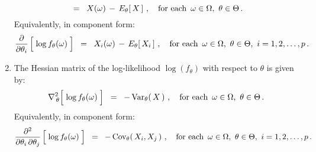 \begin{theorem}
\begin{enumerate}
\begin{equation*}
	\;\; = \;\;
		X(\omega) \, - \, E_{\theta}\!\left[\,X\,\right]\,,
	\quad
	\textnormal{for each \,$\omega\in\Omega$, \,$\theta\in\Theta$}\,.
	\end{equation*}	
	Equivalently, in component form:
	\begin{equation*}
	\dfrac{\partial}{\partial \theta_{i}}\left[\;\overset{{\color{white}.}}{\log}\,f_{\theta}(\omega)\;\right]
	\;\; = \;\;
		X_{i}(\omega) \, - \, E_{\theta}\!\left[\,X_{i}\,\right]\,,
	\quad
	\textnormal{for each \,$\omega\in\Omega$, \,$\theta\in\Theta$, \,$i = 1,2,\ldots,p$}\,.
	\end{equation*}	
\item
	The Hessian matrix of the log-likelihood $\log(f_{\theta})$ with respect to $\theta$ is given by:
	\begin{equation*}
	\Hess_{\,\theta}\!\left[\;\overset{{\color{white}.}}{\log}\,f_{\theta}(\omega)\;\right]
	\;\; = \;\;
		-\,\Var_{\theta}\!\left(\,X\,\right)\,,
	\quad
	\textnormal{for each \,$\omega\in\Omega$, \,$\theta\in\Theta$}\,.
	\end{equation*}	
	Equivalently, in component form:
	\begin{equation*}
	\dfrac{\partial^{2}}{\partial \theta_{i}\,\partial\theta_{j}}\left[\;\overset{{\color{white}.}}{\log}\,f_{\theta}(\omega)\;\right]
	\;\; = \;\;
		-\,\Cov_{\theta}\!\left(\,X_{i},X_{j}\,\right)\,,
	\quad
	\textnormal{for each \,$\omega\in\Omega$, \,$\theta\in\Theta$, \,$i = 1,2,\ldots,p$}\,.
	\end{equation*}	
\end{enumerate}
\end{theorem}
\proof

